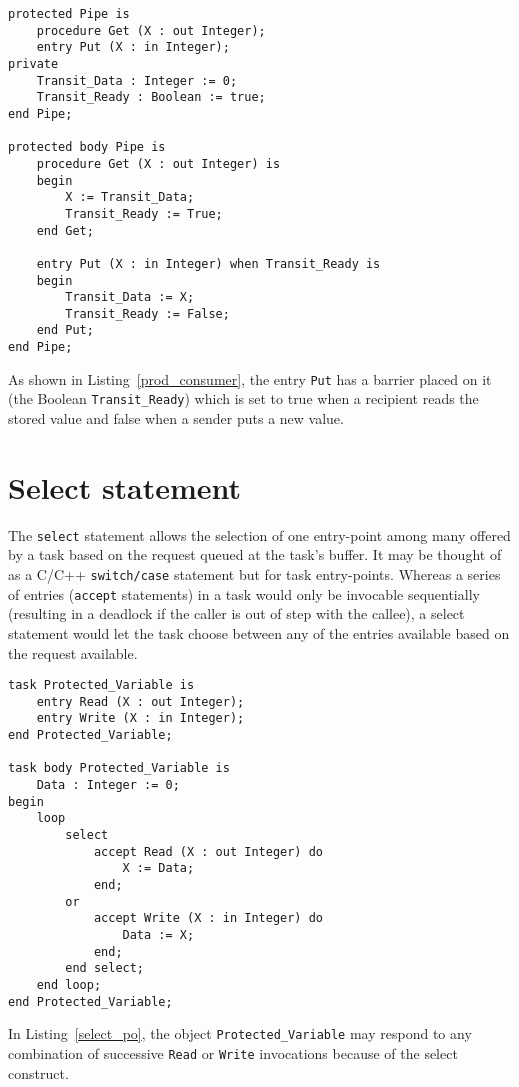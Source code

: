 \begin{minipage}{\listingwidth}
\lstset{language=ada}
\begin{lstlisting}[caption=Pipe IPC construct for two multiple tasks
    with a buffer size of 1,label=prod_consumer]
protected Pipe is
	procedure Get (X : out Integer);
	entry Put (X : in Integer);
private
	Transit_Data : Integer := 0;
	Transit_Ready : Boolean := true;
end Pipe;

protected body Pipe is
	procedure Get (X : out Integer) is
	begin
		X := Transit_Data;		
		Transit_Ready := True;
	end Get;

	entry Put (X : in Integer) when Transit_Ready is
	begin
		Transit_Data := X;
		Transit_Ready := False;
	end Put;
end Pipe;
\end{lstlisting}
\end{minipage}

As shown in Listing~\ref{prod_consumer}, the entry \texttt{Put} has a
barrier placed on it (the Boolean \texttt{Transit\_Ready}) which is
set to true when a recipient reads the stored value and false when a
sender puts a new value.

\section{Select statement}
The \texttt{select} statement allows the selection of one entry-point
among many offered by a task based on the request queued at the task's
buffer. It may be thought of as a C/C++ \texttt{switch/case} statement
but for task entry-points. Whereas a series of entries
(\texttt{accept} statements) in a task would only be invocable
sequentially (resulting in a deadlock if the caller is out of step
with the callee), a select statement would let the task choose between
any of the entries available based on the request available.

\begin{minipage}{\listingwidth}
\lstset{language=ada}
\begin{lstlisting}[caption=Protected variable implemented as a task
    with select entries,label=select_po]
task Protected_Variable is
	entry Read (X : out Integer);
	entry Write (X : in Integer);
end Protected_Variable;

task body Protected_Variable is
	Data : Integer := 0;		
begin
	loop
		select
			accept Read (X : out Integer) do
				X := Data;
			end;
		or
			accept Write (X : in Integer) do
				Data := X;
			end;
		end select;
	end loop;
end Protected_Variable;
\end{lstlisting}
\end{minipage}

In Listing~\ref{select_po}, the object \texttt{Protected\_Variable}
may respond to any combination of successive \texttt{Read} or
\texttt{Write} invocations because of the select construct.

